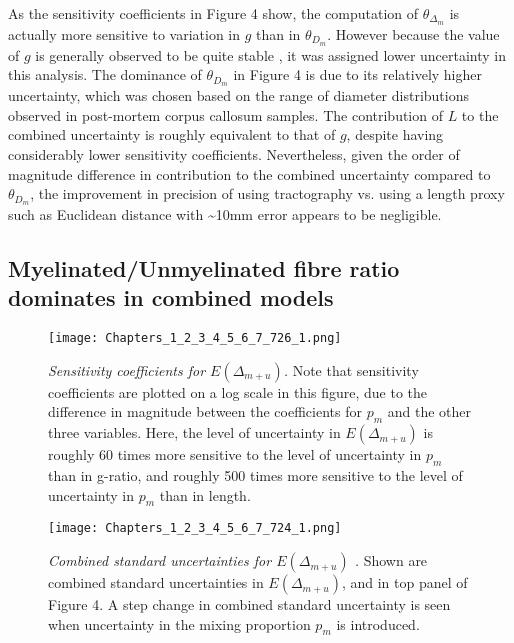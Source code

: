 As the sensitivity coefficients in Figure 4 show, the computation of $\theta_{\Delta_m}$ is actually more sensitive to variation in $g$ than in $\theta_{D_m}$. However because the value of $g$ is generally observed to be quite stable , it was assigned lower uncertainty in this analysis. The dominance of $\theta_{D_m}$ in Figure 4 is due to its relatively higher uncertainty, which was chosen based on the range of diameter distributions observed in post-mortem corpus callosum samples. The contribution of $L$ to the combined uncertainty is roughly equivalent to that of $g$, despite having considerably lower sensitivity coefficients. Nevertheless, given the order of magnitude difference in contribution to the combined uncertainty compared to $\theta_{D_m}$, the improvement in precision of using tractography vs. using a length proxy such as Euclidean distance with \textasciitilde{}10mm error appears to be negligible.



\subsection{Myelinated/Unmyelinated fibre ratio dominates in combined models}


\begin{figure}[h!]
\begin{center}
\texttt{[image: Chapters\_1\_2\_3\_4\_5\_6\_7\_726\_1.png]}%
\end{center}
\caption[\emph{Sensitivity coefficients for $E(\Delta_{m+u})$.}]{\emph{Sensitivity coefficients for $E(\Delta_{m+u})$.}
Note that sensitivity coefficients are plotted on a log scale in this figure, due to the difference in magnitude between the coefficients for \( p_{m} \) and the other three variables. Here, the level of uncertainty in \( E(\Delta_{m+u} ) \) is roughly 60 times more sensitive to the level of uncertainty in \(p_{m}\) than in g-ratio, and roughly 500 times more sensitive to the level of uncertainty in \(p_{m}\) than in length. } \label{fig:7}
\end{figure}



\begin{figure}[h!]
\begin{center}
\texttt{[image: Chapters\_1\_2\_3\_4\_5\_6\_7\_724\_1.png]}%
\end{center}
\caption[\emph{Combined standard uncertainties for $E(\Delta_{m+u})$ .}]{\emph{Combined standard uncertainties for $E(\Delta_{m+u})$ .}
Shown are combined standard uncertainties in \( E(\Delta_{m+u}) \), and in top panel of Figure 4. A step change in combined standard uncertainty is seen when 
uncertainty in the mixing proportion \( p_{m} \) is introduced.} \label{fig:6}
\end{figure}





